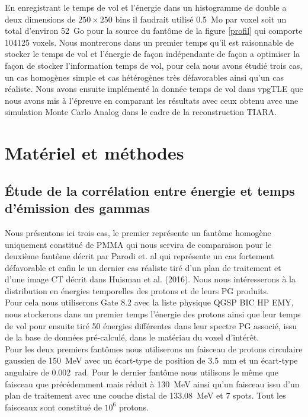 \documentclass[11pt,a4paper,oldfontcommands]{memoir}
\begin{document}
En enregistrant le temps de vol et l'énergie dans un histogramme de double a deux dimensions de $250 \times 250$ bins il faudrait utilisé 0.5~Mo par voxel soit un total d'environ 52~Go pour la source du fantôme de la figure \ref{profil} qui comporte 104125 voxels. Nous montrerons dans un premier temps qu'il est raisonnable de stocker le temps de vol et l’énergie de façon indépendante de façon a optimiser la façon de stocker l'information temps de vol, pour cela nous avons étudié trois cas, un cas homogènes simple et cas hétérogènes très défavorables ainsi qu'un cas réaliste. Nous avons ensuite implémenté la donnée temps de vol dans vpgTLE que nous avons mis à l'épreuve en comparant les résultats avec ceux obtenu avec une simulation Monte Carlo Analog dans le cadre de la reconstruction TIARA.

\section{Matériel et méthodes}

\subsection{\'Etude de la corrélation entre énergie et temps d'émission des gammas}

Nous présentons ici trois cas, le premier représente un fantôme homogène uniquement constitué de PMMA qui nous servira de comparaison pour le deuxième fantôme décrit par Parodi et. al \cite{1487723} qui représente un cas fortement défavorable et enfin le un dernier cas réaliste tiré d'un plan de traitement et d'une image CT décrit dans Huisman et al. (2016). Nous nous intéresserons à la distribution en énergies temporelles des protons et de leurs PG produits.\\ Pour cela nous utiliserons Gate 8.2 avec la liste physique QGSP BIC HP EMY, nous stockerons dans un premier temps l'énergie des protons ainsi que leur temps de vol pour ensuite tiré 50 énergies différentes dans leur spectre PG associé, issu de la base de données pré-calculé, dans le matériau du voxel d'intérêt.\\
Pour les deux premiers fantômes nous utiliserons un faisceau de protons circulaire gaussien de 150~MeV avec un écart-type de position de 3.5~mm et un écart-type angulaire de 0.002~rad. Pour le dernier fantôme nous utilisons le même que faisceau que précédemment mais réduit à 130~MeV ainsi qu'un faisceau issu d'un plan de traitement avec une couche distal de 133.08~MeV et 7 spots. Tout les faisceaux sont constitué de $10^6$ protons. 
\end{document}
